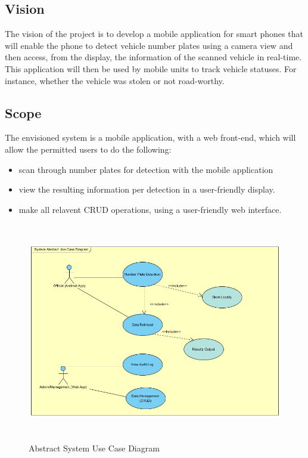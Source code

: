 \documentclass[12pt]{article}
\begin{document}
                		\subsection{Vision}
                				The vision of the project is to develop a mobile application for smart phones that will enable the phone to detect vehicle number plates using a camera view and then access, from the display, the information of the scanned vehicle in real-time. This application will then be used by mobile units to track vehicle statuses. For instance, whether the vehicle was stolen or not road-worthy.
                		\subsection{Scope}
                			
                				The envisioned system is a mobile application, with a web front-end, which will allow the permitted users to do the following:
                			    		\begin{itemize}
                								\item scan through number plates for detection with the mobile application
                				                \item view the resulting information per detection in a user-friendly display.
                				                \item make all relavent CRUD operations, using a user-friendly web interface.
                				                
                			            \end{itemize}
                			            
           						\begin{figure}[h]
			           				\centering
			           				\includegraphics[width=5.51in, height=3.77in]{Pictures/AbstractUseCase.jpg}
			           				\caption{Abstract System Use Case Diagram}
           						\end{figure}
                				\FloatBarrier
                				
\end{document}
